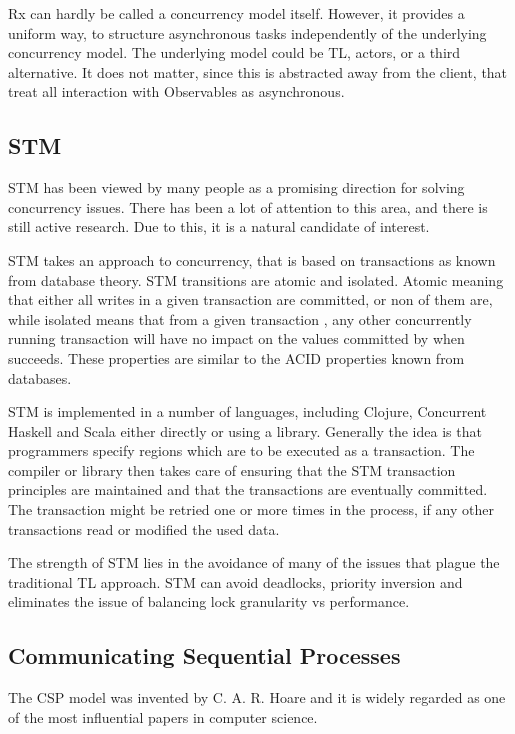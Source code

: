 \ac{Rx} can hardly be called a concurrency model itself. However, it provides a uniform way, to structure asynchronous tasks independently of the underlying concurrency model. The underlying model could be \ac{TL}, actors, or a third alternative. It does not matter, since this is abstracted away from the client, that treat all interaction with Observables as asynchronous.

\subsection{\acl{STM}}
\ac{STM} has been viewed by many people as a promising direction for solving concurrency issues\cite{sutter2005software}. There has been a lot of attention to this area, and there is still active research. Due to this, it is a natural candidate of interest.

\ac{STM} takes an approach to concurrency, that is based on transactions as known from database theory\cite[p. 1]{shavit1997software}. \ac{STM} transitions are atomic and isolated. Atomic meaning that either all writes in a given transaction are committed, or non of them are, while isolated means that from a given transaction , any other concurrently running transaction will have no impact on the values committed by  when  succeeds\cite[p. 102]{sevenModels}. These properties are similar to the \ac{ACID} properties known from databases\cite[p. 754]{elmasri2011fundamentals}.

\ac{STM} is implemented in a number of languages, including Clojure\cite[p. 101]{sevenModels}, Concurrent Haskell\cite{harris2005composable} and Scala\cite{goodman2011muts} either directly or using a library. Generally the idea is that programmers specify regions which are to be executed as a transaction. The compiler or library then takes care of ensuring that the \ac{STM} transaction principles are maintained and that the transactions are eventually committed\cite[p. 1]{saha2006mcrt}. The transaction might be retried one or more times in the process, if any other transactions read or modified the used data.

The strength of \ac{STM} lies in the avoidance of many of the issues that plague the traditional \ac{TL} approach. \ac{STM} can avoid deadlocks, priority inversion and eliminates the issue of balancing lock granularity vs performance\cite[p. 1]{harris2005composable}.

\subsection{Communicating Sequential Processes}
The \ac{CSP} model was invented by C. A. R. Hoare and it is widely regarded as one of the most influential papers in computer science\cite{abdallah2005communicating}. 

